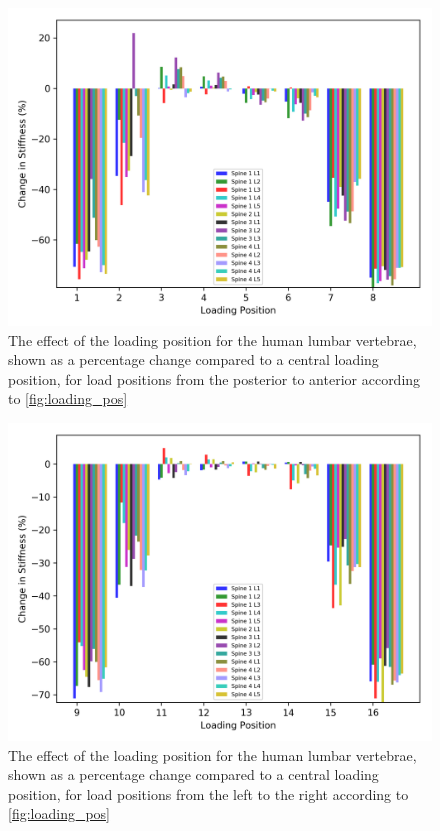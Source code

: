 \begin{figure}[ht!]
\centering
\includegraphics[width=\textwidth]{Chapters/Chapter_HT_images/hum_ap.png}
\caption{The effect of the loading position for the human lumbar vertebrae,
shown as a percentage change compared to a central loading position, for load
positions from the posterior to anterior according to \cref{fig:loading_pos}}
\label{fig:hum_load_ap}
\end{figure}

\begin{figure}[ht!]
\centering
\includegraphics[width=\textwidth]{Chapters/Chapter_HT_images/hum_lr.png}
\caption{The effect of the loading position for the human lumbar vertebrae,
shown as a percentage change compared to a central loading position, for load
positions from the left to the right according to \cref{fig:loading_pos}}
\label{fig:hum_load_lr}
\end{figure}



